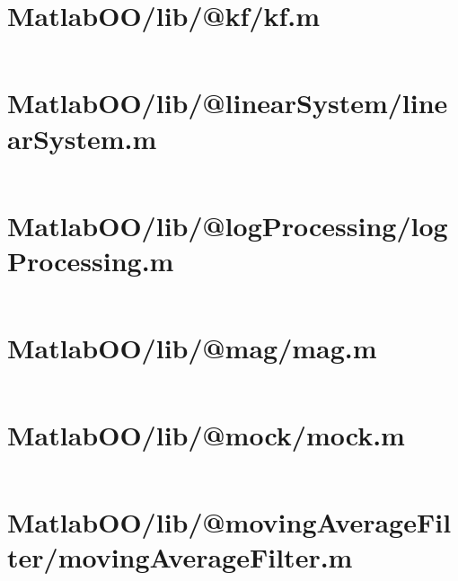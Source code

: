 \pagebreak
\section*{MatlabOO/lib/@kf/kf.m}\label{code:MatlabOO/lib/@kf/kf.m}
\inputminted[linenos,fontsize=\scriptsize]{matlab}{/home/dcouture/git/mathyourlife/TSatPy/beta_versions/matlab_object_oriented/lib/@kf/kf.m}

\pagebreak
\section*{MatlabOO/lib/@linearSystem/linearSystem.m}\label{code:MatlabOO/lib/@linearSystem/linearSystem.m}
\inputminted[linenos,fontsize=\scriptsize]{matlab}{/home/dcouture/git/mathyourlife/TSatPy/beta_versions/matlab_object_oriented/lib/@linearSystem/linearSystem.m}

\pagebreak
\section*{MatlabOO/lib/@logProcessing/logProcessing.m}\label{code:MatlabOO/lib/@logProcessing/logProcessing.m}
\inputminted[linenos,fontsize=\scriptsize]{matlab}{/home/dcouture/git/mathyourlife/TSatPy/beta_versions/matlab_object_oriented/lib/@logProcessing/logProcessing.m}

\pagebreak
\section*{MatlabOO/lib/@mag/mag.m}\label{code:MatlabOO/lib/@mag/mag.m}
\inputminted[linenos,fontsize=\scriptsize]{matlab}{/home/dcouture/git/mathyourlife/TSatPy/beta_versions/matlab_object_oriented/lib/@mag/mag.m}

\pagebreak
\section*{MatlabOO/lib/@mock/mock.m}\label{code:MatlabOO/lib/@mock/mock.m}
\inputminted[linenos,fontsize=\scriptsize]{matlab}{/home/dcouture/git/mathyourlife/TSatPy/beta_versions/matlab_object_oriented/lib/@mock/mock.m}

\pagebreak
\section*{MatlabOO/lib/@movingAverageFilter/movingAverageFilter.m}\label{code:MatlabOO/lib/@movingAverageFilter/movingAverageFilter.m}
\inputminted[linenos,fontsize=\scriptsize]{matlab}{/home/dcouture/git/mathyourlife/TSatPy/beta_versions/matlab_object_oriented/lib/@movingAverageFilter/movingAverageFilter.m}

